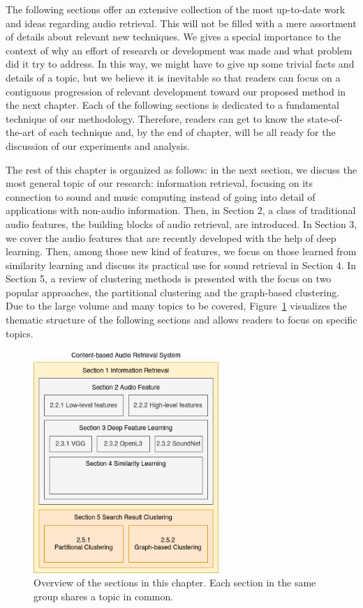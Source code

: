The following sections offer an extensive collection of the most up-to-date work and ideas regarding audio retrieval. This will not be filled with a mere assortment of details about relevant new techniques. We gives a special importance to the context of why an effort of research or development was made and what problem did it try to address. In this way, we might have to give up some trivial facts and details of a topic, but we believe it is inevitable so that readers can focus on a contiguous progression of relevant development toward our proposed method in the next chapter. Each of the following sections is dedicated to a fundamental technique of our methodology. Therefore, readers can get to know the state-of-the-art of each technique and, by the end of chapter, will be all ready for the discussion of our experiments and analysis.


The rest of this chapter is organized as follows: in the next section, we discuss the most general topic of our research: information retrieval, focusing on its connection to sound and music computing instead of going into detail of applications with non-audio information. Then, in Section 2, a class of traditional audio features, the building blocks of audio retrieval, are introduced. In Section 3, we cover the audio features that are recently developed with the help of deep learning. Then, among those new kind of features, we focus on those learned from similarity learning and discuss its practical use for sound retrieval in Section 4. In Section 5, a review of clustering methods is presented with the focus on two popular approaches, the partitional clustering and the graph-based clustering. Due to the large volume and many topics to be covered, Figure~\ref{toc-figrue} visualizes the thematic structure of the following sections and allows readers to focus on specific topics.

\begin{figure}[htb]
	\centering
	\includegraphics[width=7cm]{Figures/conceptual_relationship_of_sections.png}
	\caption{Overview of the sections in this chapter. Each section in the same group shares a topic in common.}
	\label{toc-figrue}
\end{figure}

